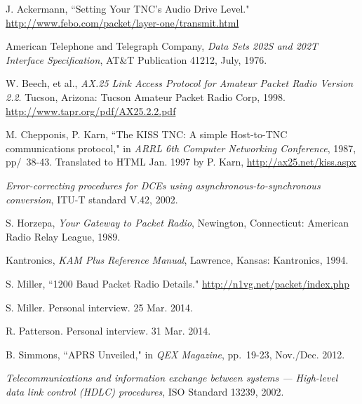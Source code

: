 \documentclass[12pt,letterpaper]{article}
\begin{document}
\begin{thebibliography}{99}

		J. Ackermann,
		``Setting Your TNC's Audio Drive Level."
		\url{http://www.febo.com/packet/layer-one/transmit.html}

		American Telephone and Telegraph Company,
		\emph{Data Sets 202S and 202T Interface Specification},
		AT\&T Publication 41212,
		July, 1976.

		W. Beech, et al.,
		\emph{AX.25 Link Access Protocol for Amateur Packet Radio Version 2.2}.
		Tucson, Arizona: Tucson Amateur Packet Radio Corp, 1998. 
		\url{http://www.tapr.org/pdf/AX25.2.2.pdf}
	
		M. Chepponis, P. Karn,
		``The KISS TNC: A simple Host-to-TNC communications protocol,"
		in \emph{ARRL 6th Computer Networking Conference},
		1987, pp/~38-43.
		Translated to HTML Jan. 1997 by P. Karn,
		\url{http://ax25.net/kiss.aspx}

		\emph{Error-correcting procedures for DCEs using 
		asynchronous-to-synchronous conversion}, ITU-T standard V.42, 2002.

		S. Horzepa,
		\emph{Your Gateway to Packet Radio},
		Newington, Connecticut: American Radio Relay League, 1989.

		Kantronics,
		\emph{KAM Plus Reference Manual},
		Lawrence, Kansas: Kantronics, 1994.

		S. Miller,
		``1200 Baud Packet Radio Details."
		\url{http://n1vg.net/packet/index.php}
	
		S. Miller. Personal interview. 25 Mar. 2014.

		R. Patterson. Personal interview. 31 Mar. 2014.

		B. Simmons,
		``APRS Unveiled," in \emph{QEX Magazine},
		pp.~19-23,
		Nov./Dec. 2012.

		\emph{Telecommunications and information
			exchange between systems --- High-level data link control (HDLC)
		procedures}, ISO Standard 13239, 2002.

\end{thebibliography}
\end{document}
